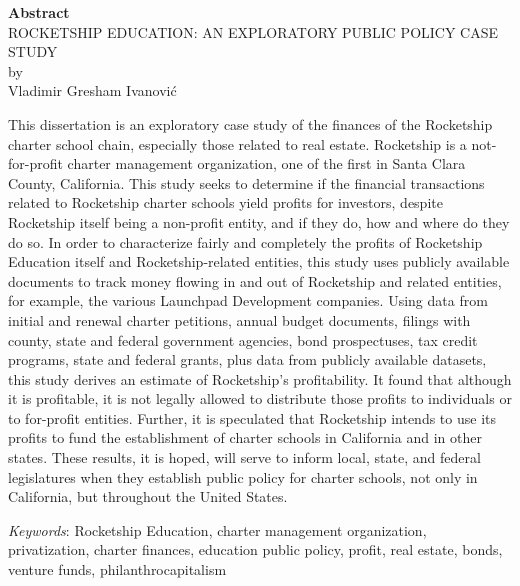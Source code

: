 
\begin{center}
  \textbf{Abstract}\\
  ROCKETSHIP EDUCATION: AN EXPLORATORY PUBLIC POLICY CASE STUDY\\
  by\\
  Vladimir Gresham Ivanović\\
\end{center}
This dissertation is an exploratory case study of the finances of the Rocketship charter school chain, especially those related to real estate. Rocketship is a  not-for-profit charter management organization, one of the first in Santa Clara County, California. This study seeks to determine if the financial transactions related to Rocketship charter schools yield profits for investors, despite Rocketship itself being a non-profit entity, and if they do, how and where do they do so. In order to characterize fairly and completely the profits of Rocketship Education itself and Rocketship-related entities, this study uses publicly available documents to track money flowing in and out of Rocketship and related entities, for example, the various Launchpad Development companies. Using data from initial and renewal charter petitions, annual budget documents, filings with county, state and federal government agencies, bond prospectuses, tax credit programs, state and federal grants, plus data from publicly available datasets, this study derives an estimate of Rocketship's profitability. It found that although it is profitable, it is not legally allowed to distribute those profits to individuals or to for-profit entities.  Further, it is speculated that Rocketship intends to use its profits to fund the establishment of charter schools in California and in other states. These results, it is hoped, will serve to inform local, state, and federal legislatures when they establish public policy for charter schools, not only in California, but throughout the United States.\bigskip

\noindent\textit{Keywords}: Rocketship Education, charter management organization, privatization, charter finances, education public policy, profit, real estate, bonds, venture funds, philanthrocapitalism

